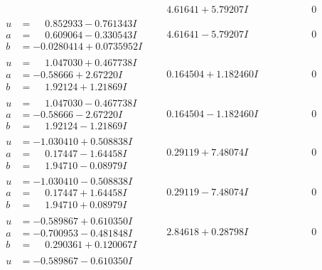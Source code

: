 \documentclass[1p]{elsarticle_modified}
\theoremstyle{definition}
\begin{document}
$$\begin{array}{c|c|c}
 & \phantom{-}4.61641 + 5.79207 I & \phantom{-0.000000 } 0 \\ \hline\begin{aligned}
u &= \phantom{-}0.852933 - 0.761343 I \\
a &= \phantom{-}0.609064 - 0.330543 I \\
b &= -0.0280414 + 0.0735952 I\end{aligned}
 & \phantom{-}4.61641 - 5.79207 I & \phantom{-0.000000 } 0 \\ \hline\begin{aligned}
u &= \phantom{-}1.047030 + 0.467738 I \\
a &= -0.58666 + 2.67220 I \\
b &= \phantom{-}1.92124 + 1.21869 I\end{aligned}
 & \phantom{-}0.164504 + 1.182460 I & \phantom{-0.000000 } 0 \\ \hline\begin{aligned}
u &= \phantom{-}1.047030 - 0.467738 I \\
a &= -0.58666 - 2.67220 I \\
b &= \phantom{-}1.92124 - 1.21869 I\end{aligned}
 & \phantom{-}0.164504 - 1.182460 I & \phantom{-0.000000 } 0 \\ \hline\begin{aligned}
u &= -1.030410 + 0.508838 I \\
a &= \phantom{-}0.17447 - 1.64458 I \\
b &= \phantom{-}1.94710 - 0.08979 I\end{aligned}
 & \phantom{-}0.29119 + 7.48074 I & \phantom{-0.000000 } 0 \\ \hline\begin{aligned}
u &= -1.030410 - 0.508838 I \\
a &= \phantom{-}0.17447 + 1.64458 I \\
b &= \phantom{-}1.94710 + 0.08979 I\end{aligned}
 & \phantom{-}0.29119 - 7.48074 I & \phantom{-0.000000 } 0 \\ \hline\begin{aligned}
u &= -0.589867 + 0.610350 I \\
a &= -0.700953 - 0.481848 I \\
b &= \phantom{-}0.290361 + 0.120067 I\end{aligned}
 & \phantom{-}2.84618 + 0.28798 I & \phantom{-0.000000 } 0 \\ \hline\begin{aligned}
u &= -0.589867 - 0.610350 I \\

\end{aligned}
\end{array}$$
\end{document}
